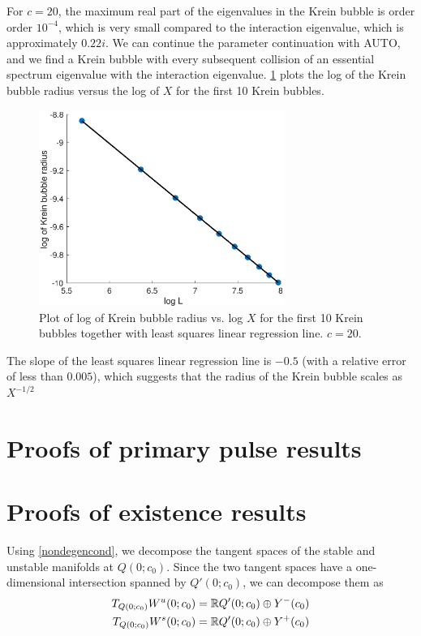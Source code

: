 \documentclass[11pt,reqno]{amsart}
\theoremstyle{plain}
\theoremstyle{definition}
\theoremstyle{remark}
\begin{document}
For $c = 20$, the maximum real part of the eigenvalues in the Krein bubble is order order $10^{-4}$, which is very small compared to the interaction eigenvalue, which is approximately $0.22i$. We can continue the parameter continuation with AUTO, and we find a Krein bubble with every subsequent collision of an essential spectrum eigenvalue with the interaction eigenvalue. \cref{fig:kreinbubbleradius} plots the log of the Krein bubble radius versus the log of $X$ for the first 10 Krein bubbles.
\begin{figure}
\begin{center}
\includegraphics[width=8cm]{images/kreinbubbleradius}
\end{center}
\caption[Krein bubble radius for KdV5]{Plot of log of Krein bubble radius vs. log $X$ for the first 10 Krein bubbles together with least squares linear regression line. $c = 20$.}
\label{fig:kreinbubbleradius}
\end{figure}
The slope of the least squares linear regression line is $-0.5$ (with a relative error of less than $0.005$), which suggests that the radius of the Krein bubble scales as $X^{-1/2}$

\appendix
\section{Proofs of primary pulse results}
\section{Proofs of existence results}

Using \cref{nondegencond}, we decompose the tangent spaces of the stable and unstable manifolds at $Q(0; c_0)$. Since the two tangent spaces have a one-dimensional intersection spanned by $Q'(0; c_0)$, we can decompose them as 
\begin{equation}\label{TQ0decomp1}
\begin{aligned}
T_{Q(0; c_0)}W^u(0; c_0) &= \mathbb{R} Q'(0; c_0) \oplus Y^-(c_0) \\
T_{Q(0; c_0)}W^s(0; c_0) &= \mathbb{R} Q'(0; c_0) \oplus Y^+(c_0)
\end{aligned}
\end{equation}
\end{document}
